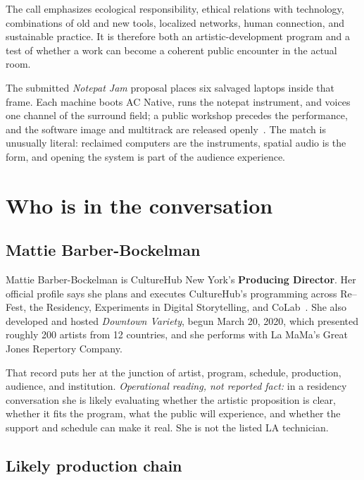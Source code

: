 \documentclass[10pt,letterpaper,twocolumn]{article}
\begin{document}
The call emphasizes ecological responsibility, ethical relations with technology, combinations of old and new tools, localized networks, human connection, and sustainable practice. It is therefore both an artistic-development program and a test of whether a work can become a coherent public encounter in the actual room.

The submitted \emph{Notepat Jam} proposal places six salvaged laptops inside that frame. Each machine boots AC Native, runs the notepat instrument, and voices one channel of the surround field; a public workshop precedes the performance, and the software image and multitrack are released openly~\citep{notepatjam}. The match is unusually literal: reclaimed computers are the instruments, spatial audio is the form, and opening the system is part of the audience experience.

\section{Who is in the conversation}

\subsection{Mattie Barber-Bockelman}

Mattie Barber-Bockelman is CultureHub New York's \textbf{Producing Director}. Her official profile says she plans and executes CultureHub's programming across Re--Fest, the Residency, Experiments in Digital Storytelling, and CoLab~\citep{chmattie}. She also developed and hosted \emph{Downtown Variety}, begun March 20, 2020, which presented roughly 200 artists from 12 countries, and she performs with La MaMa's Great Jones Repertory Company.

That record puts her at the junction of artist, program, schedule, production, audience, and institution. \textit{Operational reading, not reported fact:} in a residency conversation she is likely evaluating whether the artistic proposition is clear, whether it fits the program, what the public will experience, and whether the support and schedule can make it real. She is not the listed LA technician.

\subsection{Likely production chain}
\end{document}
